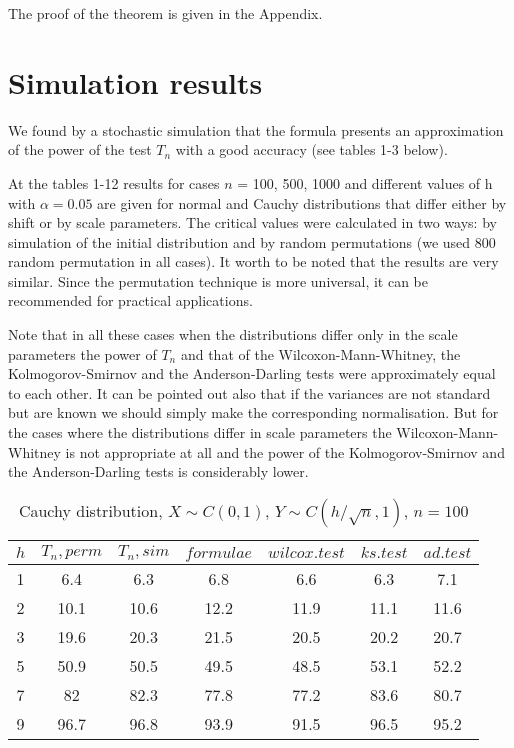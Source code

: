 \documentclass{svproc}
\begin{document}
The proof of the theorem is given in the Appendix.








\section{Simulation results}


 We found by a stochastic simulation that the formula presents an approximation of the power of the test $T_n$ with a good accuracy (see tables 1-3 below).

 At the tables 1-12 results for cases $n$ = 100, 500, 1000 and different values of h with $\alpha=0.05$ are given for normal and Cauchy distributions that differ either by shift or by scale parameters. The critical values were calculated in two ways: by simulation of the initial distribution and by random permutations (we used 800 random permutation in all cases). It worth to be noted that the results are very similar. Since the permutation technique is more universal, it can be recommended for practical applications.


Note that in all these cases when the distributions differ only in the scale parameters the power of  $T_n$ and  that of the Wilcoxon-Mann-Whitney, the
Kol\-mogorov-Smirnov and the Anderson-Darling tests were approximately equal to each other.
It can be pointed out also that if the variances are not standard  but are known we should simply make the corresponding normalisation.
But for the cases where the distributions differ in scale parameters the Wilcoxon-Mann-Whitney is not appropriate at all and the power of  the Kolmogorov-Smirnov and the Anderson-Darling tests is considerably lower.



\begin{table}
  \caption{Cauchy distribution, $X\sim C(0,1)$, $Y\sim C(h/\sqrt{n},1)$, $n=100$}
  \begin{center}
  \begin{tabular}{c@{\quad}c@{\quad}c@{\quad}c@{\quad}c@{\quad}c@{\quad}c}
  \hline
  $h$ & $T_n, perm$ & $T_n, sim$ & $formulae$ & $wilcox.test$ & $ks.test$ & $ad.test$ \\
  \hline
  1 & 6.4 & 6.3 & 6.8 & 6.6 & 6.3 & 7.1\\
  2 & 10.1 & 10.6 & 12.2 & 11.9 & 11.1 & 11.6 \\
  3 & 19.6 & 20.3 & 21.5 & 20.5 & 20.2 & 20.7 \\
  5 & 50.9 & 50.5 & 49.5 & 48.5 & 53.1 & 52.2 \\
  7 & 82 & 82.3 & 77.8 & 77.2 & 83.6 & 80.7 \\
  9 & 96.7 & 96.8 & 93.9 & 91.5 & 96.5 & 95.2 \\
  \hline
  \end{tabular}
  \end{center}
\end{table}
\end{document}
